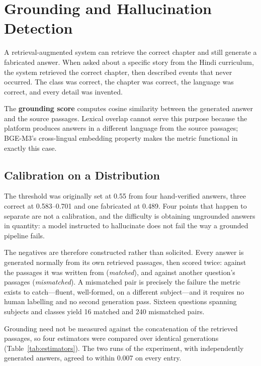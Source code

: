 \documentclass[conference]{IEEEtran}
\begin{document}
\section{Grounding and Hallucination Detection}

A retrieval-augmented system can retrieve the correct chapter and still generate a fabricated answer. When asked about a specific story from the Hindi curriculum, the system retrieved the correct chapter, then described events that never occurred. The class was correct, the chapter was correct, the language was correct, and every detail was invented.

The \textbf{grounding score} computes cosine similarity between the generated answer and the source passages. Lexical overlap cannot serve this purpose because the platform produces answers in a different language from the source passages; BGE-M3's cross-lingual embedding property makes the metric functional in exactly this case.

\subsection{Calibration on a Distribution}
The threshold was originally set at 0.55 from four hand-verified answers, three correct at 0.583--0.701 and one fabricated at 0.489. Four points that happen to separate are not a calibration, and the difficulty is obtaining ungrounded answers in quantity: a model instructed to hallucinate does not fail the way a grounded pipeline fails.

The negatives are therefore constructed rather than solicited. Every answer is generated normally from its own retrieved passages, then scored twice: against the passages it was written from (\emph{matched}), and against another question's passages (\emph{mismatched}). A mismatched pair is precisely the failure the metric exists to catch---fluent, well-formed, on a different subject---and it requires no human labelling and no second generation pass. Sixteen questions spanning subjects and classes yield 16 matched and 240 mismatched pairs.

Grounding need not be measured against the concatenation of the retrieved passages, so four estimators were compared over identical generations (Table~\ref{tab:estimators}). The two runs of the experiment, with independently generated answers, agreed to within 0.007 on every entry.
\end{document}
